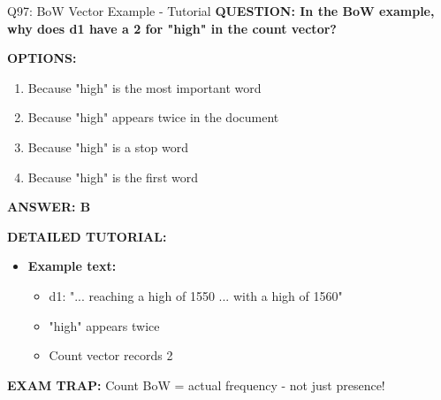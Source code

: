 \documentclass[8pt]{beamer}
\begin{document}
	\begin{frame}{Q97: BoW Vector Example - Tutorial}
		\fontsize{6.5}{7.5}\selectfont
		\textbf{QUESTION: In the BoW example, why does d1 have a 2 for "high" in the count vector?}
		
		\vspace{0.1cm}
		\textbf{OPTIONS:}
		\begin{enumerate}
			\item Because "high" is the most important word
			\item Because "high" appears twice in the document
			\item Because "high" is a stop word
			\item Because "high" is the first word
		\end{enumerate}
		
		\vspace{0.1cm}
		\textcolor{myblue}{\textbf{ANSWER: B}}
		
		\vspace{0.1cm}
		\textbf{DETAILED TUTORIAL:}
		\begin{itemize}
			\item \textbf{Example text:}
			\begin{itemize}
				\item d1: "... reaching a high of 1550 ... with a high of 1560"
				\item "high" appears twice
				\item Count vector records 2
			\end{itemize}
		\end{itemize}
		
		\textcolor{myred}{\textbf{EXAM TRAP:}} Count BoW = \textcolor{myblue}{actual frequency} - not just presence!
	\end{frame}
	
\end{document}
